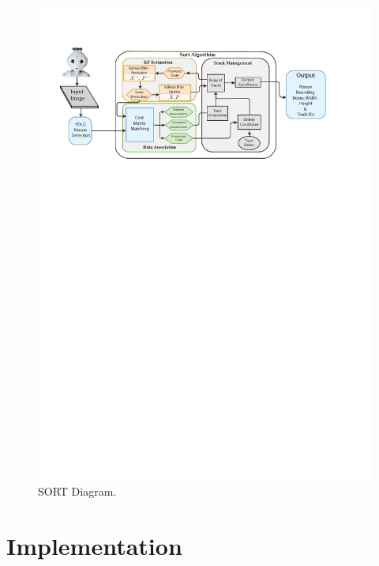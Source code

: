 \documentclass{CSSRforAfrica}
\begin{document}
\begin{figure}[!hbpt]
	\centering
	\includegraphics[scale=0.8]{images/SORT_Diagram.pdf}
	\caption{SORT Diagram.}
	\label{fig: SORT Diagram}
\end{figure}

\newpage

\section{Implementation}
\end{document}
